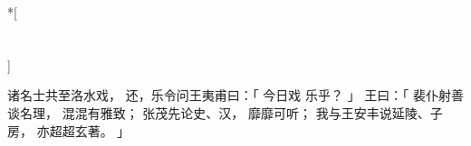 
\switchcolumn[0]*[\section{}]

诸名士共至洛水戏，
还，乐令问王夷甫曰：「
    今日戏
    乐乎？
」
王曰：「
    裴仆射善谈名理，
    混混有雅致；
    张茂先论史、汉，
    靡靡可听；
    我与王安丰说延陵、子房，
    亦超超玄著。
」

\switchcolumn



